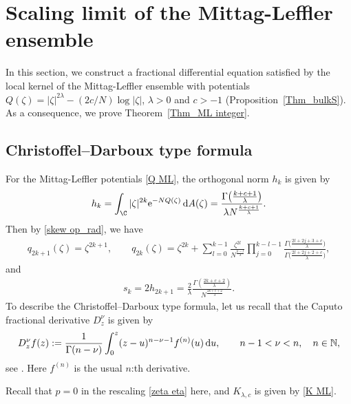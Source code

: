 \section{Scaling limit of the Mittag-Leffler ensemble}

In this section, we construct a fractional differential equation satisfied by the local kernel of the Mittag-Leffler ensemble with potentials $Q(\zeta)=|\zeta|^{2\lambda}-(2c/N)\log|\zeta|$, $\lambda>0$ and $c>-1$ (Proposition~\ref{Thm_bulkS}). As a consequence, we prove Theorem~\ref{Thm_ML integer}.

\subsection{Christoffel--Darboux type formula}
For the Mittag-Leffler potentials \eqref{Q ML}, the orthogonal norm $h_k$ is given by
\begin{gather*}
h_k=\int_\C |\zeta|^{2k} {\rm e}^{-N Q(\zeta)} \, {\rm d}A(\zeta)=\frac{\Gamma\big( \frac{k+c+1}{\lambda} \big)}{\lambda N^{\frac{k+c+1}{\lambda}} } .
\end{gather*}
Then by \eqref{skew op_rad}, we have
\begin{gather} \label{SOP ML}
	q_{2k+1}(\zeta)=\zeta^{2k+1}, \qquad q_{2k}(\zeta)=\zeta^{2k}+ \sum_{l=0}^{k-1} \frac{\zeta^{2l}}{N^{\frac{k-l}{\lambda}}} \prod_{j=0}^{k-l-1} \frac{ \Gamma\big( \frac{2l+2j+3+c}{\lambda} \big) }{ \Gamma\big( \frac{2l+2j+2+c}{\lambda} \big) } ,
\end{gather}
and
\begin{gather} \label{sk ML}
	s_k=2h_{2k+1}=\frac{2}{\lambda } \frac{\Gamma( \frac{2k+c+2}{\lambda} )}{N^{\frac{2k+c+2}{\lambda}} } .
\end{gather}
To describe the Christoffel--Darboux type formula, let us recall that the Caputo fractional derivative $D^\nu_z$ is given by
\begin{gather*}
	D^\nu_z f(z):=\frac{1}{\Gamma(n-\nu)} \int_{0}^{z} (z-u)^{n-\nu-1} f^{(n)}(u) \, {\rm d}u, \qquad n-1 < \nu <n, \quad n \in \mathbb{N},
\end{gather*}
see \cite[Section 2.4]{MR2218073}. Here $f^{(n)}$ is the usual $n$:th derivative.

Recall that $p=0$
in the rescaling \eqref{zeta eta} here,
and $K_{\lambda,c}$ is given by \eqref{K ML}.

